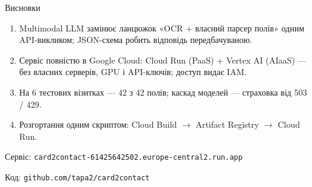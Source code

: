 \documentclass[aspectratio=169,11pt]{beamer}
\newcommand{\code}[1]{\texttt{#1}}
\begin{document}
\begin{frame}{Висновки}
  \begin{enumerate}
    \item Multimodal LLM замінює ланцюжок «OCR + власний парсер полів» одним API-викликом;
          JSON-схема робить відповідь передбачуваною.
    \item Сервіс повністю в Google Cloud: Cloud Run (PaaS) + Vertex AI (AIaaS) ---
          без власних серверів, GPU і API-ключів; доступ видає IAM.
    \item На 6 тестових візитках --- 42 з 42 полів; каскад моделей --- страховка від 503 / 429.
    \item Розгортання одним скриптом: Cloud Build $\to$ Artifact Registry $\to$ Cloud Run.
  \end{enumerate}

  \vspace{1.6em}
  \centering
  {\large Сервіс: \code{card2contact-61425642502.europe-central2.run.app}\par}
  \smallskip
  {\large Код: \code{github.com/tapa2/card2contact}}
\end{frame}
\end{document}
